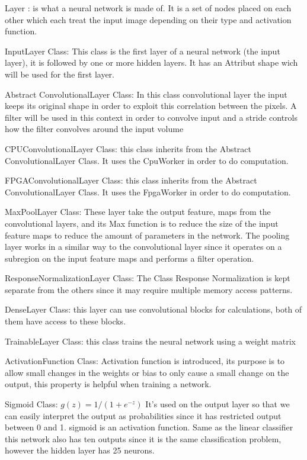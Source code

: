 \documentclass[parskip=full]{scrartcl}
\begin{document}
Layer : is what a neural network is made of. It is a set of nodes placed on each other which each treat the input image depending on their type and activation function.




InputLayer Class: This class is the first layer of a neural network (the input layer), it is followed by one or more hidden layers.  It has an Attribut shape wich will be used for the first layer.

Abstract ConvolutionalLayer Class: In this class convolutional layer the input keeps its original shape in order to exploit this correlation between the pixels. A filter will be used in this context in order to convolve input and a stride controls how the filter convolves around the input volume

CPUConvolutionalLayer Class: this class inherits from the Abstract ConvolutionalLayer Class. It uses the CpuWorker in order to do computation.

FPGAConvolutionalLayer Class: this class inherits from the Abstract ConvolutionalLayer Class. It uses the FpgaWorker in order to do computation.

MaxPoolLayer Class: These layer take the output feature, maps from the convolutional layers, and its Max function is to reduce the size of the input feature maps to reduce the amount of parameters in the network.
The pooling layer works in a similar way to the convolutional layer since it operates on a subregion on the input feature maps and performs a filter operation.

ResponseNormalizationLayer Class: The Class Response Normalization is kept separate from the others since it may require multiple memory access patterns.

DenseLayer Class:  this layer can use convolutional blocks for calculations, both of them have access to these blocks.

TrainableLayer Class: this class trains the neural network using a weight matrix

ActivationFunction Class:  Activation function is introduced, its purpose is to allow small changes in the weights or bias to only cause a small change on the output, this property is helpful when training a network.

Sigmoid Class:  $g(z) = 1 / (1 + e^{-z})$ It’s used on the output layer so that we can easily interpret the output as probabilities since it has restricted output between 0 and 1.
sigmoid is an activation function.  Same as the linear classifier this network also has ten outputs since it is the same classification problem, however the hidden layer has 25 neurons.
\end{document}

